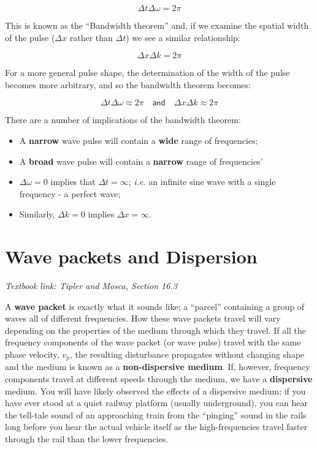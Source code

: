 \documentclass[
]{book}
\providecommand{\tightlist}{%
  \setlength{\itemsep}{0pt}\setlength{\parskip}{0pt}}
\begin{document}
\begin{equation}
\Delta t \Delta \omega = 2\pi
\end{equation}

This is known as the ``Bandwidth theorem'' and, if we examine the spatial width of the pulse (\(\Delta x\) rather than \(\Delta t\)) we see a similar relationship:

\begin{equation}
\Delta x \Delta k = 2\pi
\end{equation}

For a more general pulse shape, the determination of the width of the pulse becomes more arbitrary, and so the bandwidth theorem becomes:

\begin{equation}
\Delta t \Delta \omega \approx 2\pi \quad \textsf{and} \quad \Delta x \Delta k \approx 2\pi
\end{equation}

There are a number of implications of the bandwidth theorem:

\begin{itemize}
\tightlist
\item
  A \textbf{narrow} wave pulse will contain a \textbf{wide} range of frequencies;
\item
  A \textbf{broad} wave pulse will contain a \textbf{narrow} range of frequencies'
\item
  \(\Delta \omega = 0\) implies that \(\Delta t = \infty\); \emph{i.e.} an infinite sine wave with a single frequency - a perfect wave;
\item
  Similarly, \(\Delta k = 0\) implies \(\Delta x = \infty\).
\end{itemize}

\hypertarget{sec:ch12-wavepackets}{%
\chapter{Wave packets and Dispersion}\label{sec:ch12-wavepackets}}

\emph{Textbook link: Tipler and Mosca, Section 16.3}

A \textbf{wave packet} is exactly what it sounds like; a ``parcel'' containing a group of waves all of different frequencies. How these wave packets travel will vary depending on the properties of the medium through which they travel. If all the frequency components of the wave packet (or wave pulse) travel with the same phase velocity, \(v_p\), the resulting disturbance propagates without changing shape and the medium is known as a \textbf{non-dispersive medium}. If, however, frequency components travel at different speeds through the medium, we have a \textbf{dispersive} medium. You will have likely observed the effects of a dispersive medium; if you have ever stood at a quiet railway platform (usually underground), you can hear the tell-tale sound of an approaching train from the ``pinging'' sound in the rails long before you hear the actual vehicle itself as the high-frequencies travel faster through the rail than the lower frequencies.
\end{document}
